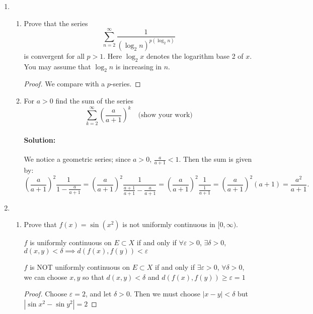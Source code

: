 \documentclass{article}
\begin{document}
\begin{enumerate} 

\item \begin{enumerate}
        \item Prove that the series $$\sum_{n=2}^\infty\frac1{(\log_2n)^{p(\log_2n)}}$$
        is convergent for all $p>1.$ Here $\log_2x$ denotes the logarithm base 2 of $x.$ You may assume
        that $\log_2n$ is increasing in $n.$

        \begin{proof} 
            We compare with a $p$-series. %
        \end{proof}

        \item For $a>0$ find the sum of the series
        $$\sum_{k=2}^\infty\left(\frac a{a+1}\right)^k\quad\text{(show your work)}$$

        \paragraph{Solution: }We notice a geometric series; since $a>0$, $\frac{a}{a+1}<1$. Then the sum
        is given by:
        \[
        \left(\frac{a}{a+1}\right)^2 \frac{1}{1-\frac{a}{a+1}}=
        \left(\frac{a}{a+1}\right)^2 \frac{1}{\frac{a+1}{a+1}-\frac{a}{a+1}}=
        \left(\frac{a}{a+1}\right)^2 \frac{1}{\frac{1}{a+1}}=
        \left(\frac{a}{a+1}\right)^2 (a+1)=\frac{a^2}{a+1}
        .\] 

    \end{enumerate}
\item \begin{enumerate}
        \item Prove that $f\left(x\right)=\sin\left(x^{2}\right)$ is not uniformly continuous in $[0,\infty).$

            $f$ is uniformly continuous on $E\subset X$ if and only if $\forall\varepsilon>0$, $\exists \delta>0$, $d(x,y)<\delta\implies d(f(x),f(y))<\varepsilon$

            $f$ is NOT uniformly continuous on $E\subset X$ if and only if $\exists\varepsilon>0$, $\forall  \delta>0$, we can choose $x,y$ so that $d(x,y)<\delta$ and $ d(f(x),f(y))\geq\varepsilon=1$
            \begin{proof} 

                Choose $\varepsilon=2$, and let $\delta>0$. Then we must choose $|x-y|<\delta$ but 
                $|\sin x^2-\sin y^2|=2$


\end{proof}
\end{enumerate}
\end{enumerate}
\end{document}
